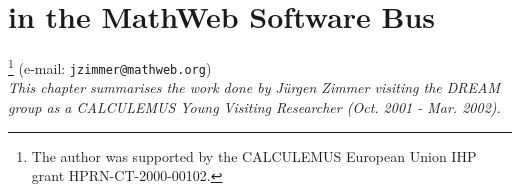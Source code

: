 \def\ND{{\small\bf ND}}
\def\nuprl{{Nuprl}}
\def\octopus{\mbox{$\Omega${\sc cTOpus}}\xspace}
\def\OMEGA{$\Omega${\sc mega}}
\def\omws{OMWS}
\def\otter{{\sc Otter}}
\def\oyster{{\mbox{\rm O\kern-.12em\raise.39ex\hbox{\sc y}\kern-.07emS\kern-.39em\raise.39ex\hbox{\sc t}\kern-.15em\hbox{\sc e}R}}}
\def\oz{{\sc Oz}}

\def\pds{PDS}
\def\POST{{\mbox{$\cal POST$}}}
\def\post{{\POST}}
\def\Post{{\POST}}
\def\prolog{PROLOG}
\def\lprolog{$\lambda$-PROLOG}
\def\protein{\mbox{\sc ProTeIn}\xspace}
\def\proverb{{\it PROVERB\/}}
\def\rdl{{\bf RDL}}
\def\sapper{{\sc sapper}}
\def\scetchpad{\mbox{SCETCHPAD}}
\def\solex{{\bf\sf SoleX}}
\def\spass{\mbox{\sc Spass}\xspace}
\def\strips{{\small STRIPS}}
\def\teyjus{Teyjus}
\def\tramp{{\sc TRAMP}}
\def\tps{TPS}
\def\tptp{{\sc TPTP}}
\def\tptptox{tptp2X}
\def\vampire{Vampire}
\def\weierstrass{{\it Weierstrass}}
\def\xmlrpc{XML-RPC}

\def\Omegapackage{{{\small\bf OMEGA}}}


\def\nd{{\bf ND}-Kalk"ul}
\def\lamcalc{\mbox{$\lambda$-Kalk"ul}}
\def\todo#1{{\sc #1}}
\def\hol{\mbox{\sc HOL}\xspace}
\def\nqthm{${\sc Nqthm}$}
\def\clpr{\mbox{CLP(${\cal R}$)}\xspace}
\def\lmlb{\mbox{\sc LMLB}\xspace}
\def\LMLB{\mbox{\loui} {\sc M{\sc arkup}} {\sc L}{\sc anguage} {\sc B}{\sc rowser}}
\def\lml{\mbox{\sc LML}\xspace}
\def\LML{\mbox{\loui} {\sc M}{\sc arkup} {\sc L}{\sc anguage}}

\def\calculemus{\mbox{{\sc Calculemus}}}
\def\limplus{{\sc Lim-Plus}}
\def\limtimes{{\sc Lim-Times}}


\chapter{{\lclam} in the MathWeb Software Bus}\label{mathweb}

\author{J{\"u}rgen Zimmer}\footnote{The author was supported by the
  CALCULEMUS European Union IHP grant HPRN-CT-2000-00102.} (e-mail:
{\tt jzimmer@mathweb.org})\\
{\it This chapter summarises the work done by J{\"u}rgen Zimmer
  visiting the DREAM group as a CALCULEMUS Young Visiting Researcher
  (Oct. 2001 - Mar. 2002).}


